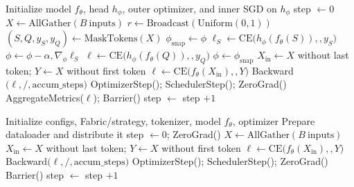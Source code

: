 \begin{algorithm}\small \caption{Distributed SMLMT Loop}\label{alg:dist-maml} \begin{algorithmic} \State Initialize model $f_\theta$, head $h_\phi$, outer optimizer, and inner SGD on $h_\phi$ \State step $\leftarrow 0$  \State $X \leftarrow \text{AllGather}(B\ \text{inputs})$  \State $r \leftarrow \text{Broadcast}(\text{Uniform}(0,1))$  \State $(S,Q,y_S,y_Q) \leftarrow \text{MaskTokens}(X)$ \State $\phi_{\text{snap}} \leftarrow \phi$   \State $\ell_S \leftarrow \text{CE}\big(h_\phi(f_\theta(S)),,y_S\big)$ \State $\phi \leftarrow \phi - \alpha,\nabla_\phi \ell_S$ \EndFor \State $\ell \leftarrow \text{CE}\big(h_\phi(f_\theta(Q)),,y_Q\big)$ \State $\phi \leftarrow \phi_{\text{snap}}$  \Else \State $X_{\text{in}} \leftarrow X$ without last token; $Y \leftarrow X$ without first token \State $\ell \leftarrow \text{CE}\big(f_\theta(X_{\text{in}}),,Y\big)$ \EndIf \State Backward$\big(\ell ,/, \text{accum\_steps}\big)$  \State OptimizerStep(); SchedulerStep(); ZeroGrad() \State AggregateMetrics($\ell$); Barrier() \EndIf \State step $\leftarrow$ step $+ 1$ \EndFor \end{algorithmic} \end{algorithm}

\begin{algorithm}\small \caption{Distributed AR Loop}\label{alg:dist-ar} \begin{algorithmic} \State Initialize configs, Fabric/strategy, tokenizer, model $f_\theta$, optimizer \State Prepare dataloader and distribute it \State step $\leftarrow 0$; ZeroGrad()  \State $X \leftarrow \text{AllGather}(B\ \text{inputs})$  \State $X_{\text{in}} \leftarrow X$ without last token; $Y \leftarrow X$ without first token \State $\ell \leftarrow \text{CE}\big(f_\theta(X_{\text{in}}),,Y\big)$ \State Backward$\big(\ell ,/, \text{accum\_steps}\big)$  \State OptimizerStep(); SchedulerStep(); ZeroGrad() \State Barrier()  \EndIf \State step $\leftarrow$ step $+ 1$ \EndFor \end{algorithmic} \end{algorithm}


\newpage 

